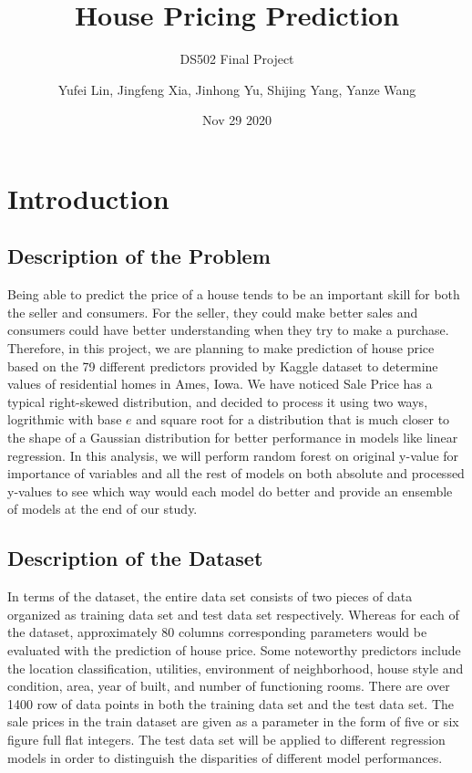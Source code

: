 \documentclass[
]{article}
\title{House Pricing Prediction}
\subtitle{DS502 Final Project}
\author{Yufei Lin, Jingfeng Xia, Jinhong Yu, Shijing Yang, Yanze Wang}
\date{Nov 29 2020}
\begin{document}
\maketitle

\hypertarget{introduction}{%
\section{Introduction}\label{introduction}}

\hypertarget{description-of-the-problem}{%
\subsection{Description of the
Problem}\label{description-of-the-problem}}

Being able to predict the price of a house tends to be an important
skill for both the seller and consumers. For the seller, they could make
better sales and consumers could have better understanding when they try
to make a purchase. Therefore, in this project, we are planning to make
prediction of house price based on the 79 different predictors provided
by Kaggle dataset to determine values of residential homes in Ames,
Iowa. We have noticed Sale Price has a typical right-skewed
distribution, and decided to process it using two ways, logrithmic with
base \(e\) and square root for a distribution that is much closer to the
shape of a Gaussian distribution for better performance in models like
linear regression. In this analysis, we will perform random forest on
original y-value for importance of variables and all the rest of models
on both absolute and processed y-values to see which way would each
model do better and provide an ensemble of models at the end of our
study.

\hypertarget{description-of-the-dataset}{%
\subsection{Description of the
Dataset}\label{description-of-the-dataset}}

In terms of the dataset, the entire data set consists of two pieces of
data organized as training data set and test data set respectively.
Whereas for each of the dataset, approximately 80 columns corresponding
parameters would be evaluated with the prediction of house price. Some
noteworthy predictors include the location classification, utilities,
environment of neighborhood, house style and condition, area, year of
built, and number of functioning rooms. There are over 1400 row of data
points in both the training data set and the test data set. The sale
prices in the train dataset are given as a parameter in the form of five
or six figure full flat integers. The test data set will be applied to
different regression models in order to distinguish the disparities of
different model performances.
\end{document}

